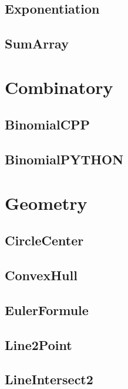 \subsection{ Exponentiation}
\raggedbottom
\hrulefill
\subsection{ SumArray}
\raggedbottom
\hrulefill

\section{Combinatory}
\subsection{ BinomialCPP}
\raggedbottom
\hrulefill
\subsection{ BinomialPYTHON}
\raggedbottom
\hrulefill

\section{Geometry}
\subsection{ CircleCenter}
\raggedbottom
\hrulefill
\subsection{ ConvexHull}
\raggedbottom
\hrulefill
\subsection{ EulerFormule}
\raggedbottom
\hrulefill
\subsection{ Line2Point}
\raggedbottom
\hrulefill
\subsection{ LineIntersect2}
\raggedbottom
\hrulefill
